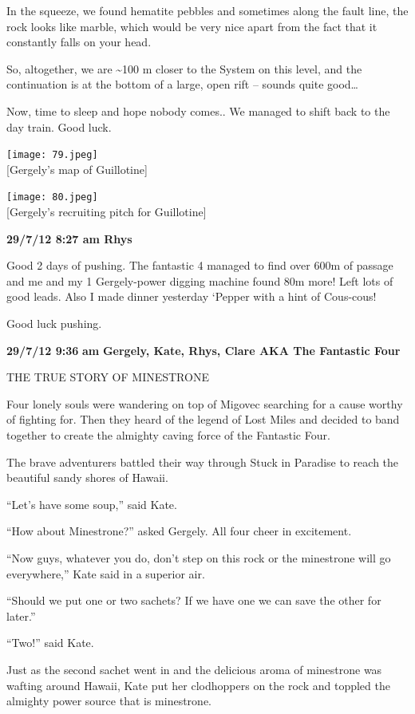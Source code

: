 In the squeeze, we found hematite pebbles and sometimes along the fault
line, the rock looks like marble, which would be very nice apart from
the fact that it constantly falls on your head.

So, altogether, we are \textasciitilde{}100 m closer to the System on
this level, and the continuation is at the bottom of a large, open rift
-- sounds quite good\ldots{}

Now, time to sleep and hope nobody comes.. We managed to shift back to
the day train. Good luck.

\texttt{[image: 79.jpeg]}\\
{[}Gergely's map of Guillotine{]}

\texttt{[image: 80.jpeg]}\\
{[}Gergely's recruiting pitch for Guillotine{]}

\textbf{29/7/12 8:27 am Rhys}

Good 2 days of pushing. The fantastic 4 managed to find over 600m of
passage and me and my 1 Gergely-power digging machine found 80m more!
Left lots of good leads. Also I made dinner yesterday `Pepper with a
hint of Cous-cous!

Good luck pushing.

\textbf{29/7/12 9:36} \textbf{am} \textbf{Gergely, Kate, Rhys, Clare AKA
The Fantastic Four}

THE TRUE STORY OF MINESTRONE

Four lonely souls were wandering on top of Migovec searching for a cause
worthy of fighting for. Then they heard of the legend of Lost Miles and
decided to band together to create the almighty caving force of the
Fantastic Four.

The brave adventurers battled their way through Stuck in Paradise to
reach the beautiful sandy shores of Hawaii.

``Let's have some soup,'' said Kate.

``How about Minestrone?'' asked Gergely. All four cheer in excitement.

``Now guys, whatever you do, don't step on this rock or the minestrone
will go everywhere,'' Kate said in a superior air.

``Should we put one or two sachets? If we have one we can save the other
for later.''

``Two!'' said Kate.

Just as the second sachet went in and the delicious aroma of minestrone
was wafting around Hawaii, Kate put her clodhoppers on the rock and
toppled the almighty power source that is minestrone.

